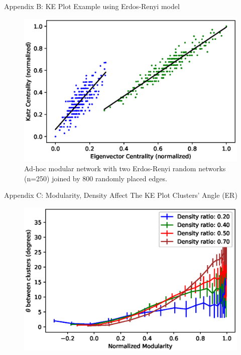 \documentclass[aspectratio=169,11pt]{beamer}
\begin{document}
\begin{frame}{Appendix B: KE Plot Example using Erdos-Renyi model}
	
	\begin{figure}
		\centering
		\includegraphics[scale=0.6]{./example_er}
		\caption{Ad-hoc modular network with two Erdos-Renyi\cite{er} random networks (n=250) joined by 800 randomly placed edges.}
	\end{figure}
\end{frame}

\begin{frame}{Appendix C: Modularity, Density Affect The KE Plot Clusters' Angle (ER)}
	\begin{figure}
		\centering
		\includegraphics[scale=0.7]{theta_er.eps}
	\end{figure}
\end{frame}
\end{document}
